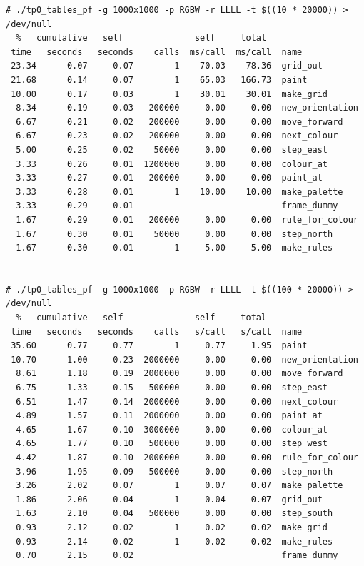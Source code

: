 \documentclass[a4paper, 10pt, twoside, notitlepage]{article}
\begin{document}
\scriptsize
\begin{verbatim}
# ./tp0_tables_pf -g 1000x1000 -p RGBW -r LLLL -t $((10 * 20000)) > /dev/null
  %   cumulative   self              self     total           
 time   seconds   seconds    calls  ms/call  ms/call  name    
 23.34      0.07     0.07        1    70.03    78.36  grid_out
 21.68      0.14     0.07        1    65.03   166.73  paint
 10.00      0.17     0.03        1    30.01    30.01  make_grid
  8.34      0.19     0.03   200000     0.00     0.00  new_orientation
  6.67      0.21     0.02   200000     0.00     0.00  move_forward
  6.67      0.23     0.02   200000     0.00     0.00  next_colour
  5.00      0.25     0.02    50000     0.00     0.00  step_east
  3.33      0.26     0.01  1200000     0.00     0.00  colour_at
  3.33      0.27     0.01   200000     0.00     0.00  paint_at
  3.33      0.28     0.01        1    10.00    10.00  make_palette
  3.33      0.29     0.01                             frame_dummy
  1.67      0.29     0.01   200000     0.00     0.00  rule_for_colour
  1.67      0.30     0.01    50000     0.00     0.00  step_north
  1.67      0.30     0.01        1     5.00     5.00  make_rules


# ./tp0_tables_pf -g 1000x1000 -p RGBW -r LLLL -t $((100 * 20000)) > /dev/null
  %   cumulative   self              self     total           
 time   seconds   seconds    calls   s/call   s/call  name    
 35.60      0.77     0.77        1     0.77     1.95  paint
 10.70      1.00     0.23  2000000     0.00     0.00  new_orientation
  8.61      1.18     0.19  2000000     0.00     0.00  move_forward
  6.75      1.33     0.15   500000     0.00     0.00  step_east
  6.51      1.47     0.14  2000000     0.00     0.00  next_colour
  4.89      1.57     0.11  2000000     0.00     0.00  paint_at
  4.65      1.67     0.10  3000000     0.00     0.00  colour_at
  4.65      1.77     0.10   500000     0.00     0.00  step_west
  4.42      1.87     0.10  2000000     0.00     0.00  rule_for_colour
  3.96      1.95     0.09   500000     0.00     0.00  step_north
  3.26      2.02     0.07        1     0.07     0.07  make_palette
  1.86      2.06     0.04        1     0.04     0.07  grid_out
  1.63      2.10     0.04   500000     0.00     0.00  step_south
  0.93      2.12     0.02        1     0.02     0.02  make_grid
  0.93      2.14     0.02        1     0.02     0.02  make_rules
  0.70      2.15     0.02                             frame_dummy



\end{verbatim}
\end{document}
